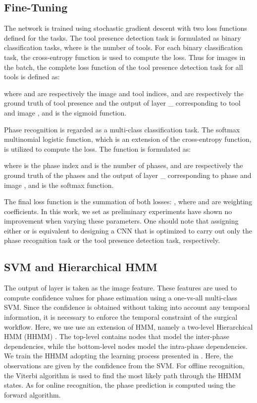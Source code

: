 \documentclass[journal]{IEEEtran} \usepackage{amssymb}
\begin{document}
\subsection{Fine-Tuning}

The network is trained using stochastic gradient descent with
two loss functions defined for the tasks. The tool presence
detection task is formulated as  binary classification tasks,
where  is the number of tools. For each binary classification
task, the cross-entropy function is used to compute the loss. Thus
for  images in the batch, the complete loss function of the tool presence
detection task for all tools is defined as:


where  and 
are respectively the image and tool indices, 
and  are respectively the ground truth of tool presence
and the output of layer \_ corresponding
to tool  and image , and 
is the sigmoid function.

Phase recognition is regarded as a multi-class
classification task. The softmax multinomial logistic function, which
is an extension of the cross-entropy function, is utilized to compute
the loss. The function is formulated as:


where  is the phase index and  is the number of phases, 
and  are respectively the ground truth of the phases
and the output of layer \_ corresponding
to phase  and image , and 
is the softmax function.

The final loss function is the summation of both losses: , 
where  and  are weighting coefficients. In this work, we set  as preliminary experiments have shown no improvement when varying these parameters.
One should note that assigning either  or  is equivalent to designing a CNN that is optimized to carry out only the phase recognition task or the tool presence detection task, respectively.


\subsection{SVM and Hierarchical HMM}

The output of layer  is taken as the image feature.
These features are used to compute confidence values  for phase estimation
using a one-vs-all multi-class SVM. Since the confidence  
is obtained without taking into account any temporal information, 
it is necessary to enforce the temporal constraint of the
surgical workflow. Here, we use use an extension of HMM, namely
a two-level Hierarchical HMM (HHMM) \cite{padoy_cvw2009}. The top-level 
contains nodes that model the inter-phase dependencies, while
the bottom-level nodes model the intra-phase dependencies. We train the
HHMM adopting the learning process presented in \cite{padoy_cvw2009}.
Here, the observations are given by the confidence 
from the SVM. For offline recognition, the Viterbi algorithm \cite{viterbi}
is used to find the most likely path through the HHMM states. As
for online recognition, the phase prediction is computed using the
forward algorithm.
\end{document}
